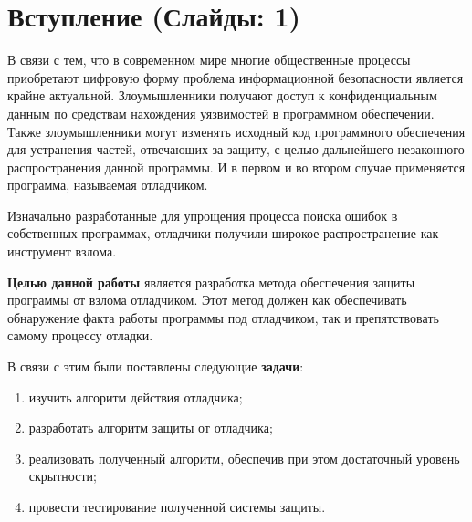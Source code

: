 
\section{Вступление (Слайды: 1)}

В связи с тем, что в современном мире многие общественные процессы приобретают
цифровую форму проблема информационной безопасности является крайне актуальной.
Злоумышленники получают доступ к конфиденциальным данным по средствам нахождения
уязвимостей в программном обеспечении. Также злоумышленники могут изменять
исходный код программного обеспечения для устранения частей, отвечающих за
защиту, с целью дальнейшего незаконного распространения данной программы. И в
первом и во втором случае применяется программа, называемая отладчиком.

Изначально разработанные для упрощения процесса поиска ошибок в собственных
программах, отладчики получили широкое распространение как инструмент взлома.

\textbf{Целью данной работы} является разработка метода обеспечения защиты
программы от взлома отладчиком. Этот метод должен как обеспечивать обнаружение
факта работы программы под отладчиком, так и препятствовать самому процессу
отладки.

В связи с этим были поставлены следующие \textbf{задачи}:
\begin{enumerate}
  \item изучить алгоритм действия отладчика;
  \item разработать алгоритм защиты от отладчика;
  \item реализовать полученный алгоритм, обеспечив при этом достаточный уровень
    скрытности;
  \item провести тестирование полученной системы защиты.
\end{enumerate}
